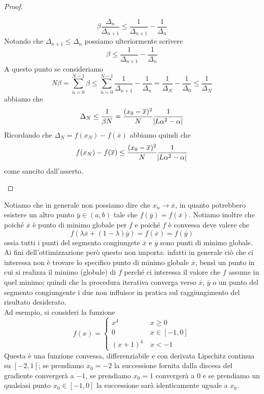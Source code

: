 \begin{proof}
\begin{enumerate}[(i)]
        \[
        \beta\frac{\Delta_n}{\Delta_{n+1}}\le \frac{1}{\Delta_{n+1}}-\frac{1}{\Delta_n}
        \]
        Notando che $\Delta_{n+1}\le \Delta_n$ possiamo ulteriormente scrivere
        \[
        \beta\le \frac{1}{\Delta_{n+1}}-\frac{1}{\Delta_n}
        \]
        A questo punto se consideriamo
        \[
        N\beta = \sum_{n=0}^{N-1} \beta \le \sum_{n=0}^{N-1}\frac{1}{\Delta_{n+1}}-\frac{1}{\Delta_n} = \frac{1}{\Delta_N}-\frac{1}{\Delta_0} \le \frac{1}{\Delta_N}
        \]
        abbiamo che
        \[
        \Delta_N \le \frac{1}{\beta N} = \frac{(x_0-\overline{x})^2}{N}\frac{1}{\abs{L\alpha^2-\alpha}}
        \]
        Ricordando che $\Delta_N = f(x_N)-f(\overline{x})$ abbiamo quindi che
        \[
        f(x_N)-f(\overline{x})\le \frac{(x_0-\overline{x})^2}{N}\frac{1}{\abs{L\alpha^2-\alpha}}
        \]
        come sancito dall'asserto.
        \end{enumerate}
    \end{proof}
    \begin{remark}
            Notiamo che in generale non possiamo dire che $x_n\to\overline{x}$, in quanto potrebbero esistere un altro punto $\overline{y}\in(a,b)$ tale che $f(\overline{y})=f(\overline{x})$. Notiamo inoltre che poiché $\overline{x}$ è punto di minimo globale per $f$ e poiché $f$ è convessa deve valere che
            \[
            f(\lambda \overline{x} +(1-\lambda)\overline{y})=f(\overline{x})=f(\overline{y})
            \]
            ossia tutti i punti del segmento congiungete $\overline{x}$ e $\overline{y}$ sono punti di minimo globale. Ai fini dell'ottimizzazione però questo non importa: infatti in generale ciò che ci interessa non è trovare lo specifico punto di minimo globale $\overline{x}$, bensì un punto in cui si realizza il minimo (globale) di $f$ perché ci interessa il valore che $f$ assume in quel minimo; quindi che la procedura iterativa converga verso $\overline{x}$, $\overline{y}$ o un punto del segmento congiungente i due non influisce in pratica sul raggiungimento del risultato desiderato. \\
            Ad esempio, si consideri la funzione
            \[
            f(x) = \begin{cases}
                x^4\, & x\ge 0\\
                0\, & x\in[-1,0]\\
                (x+1)^4\, & x<-1
            \end{cases}
            \]
            Questa è una funzione convessa, differenziabile e con derivata Lipschitz continua su $[-2,1]$; se prendiamo $x_0=-2$ la successione fornita dalla discesa del gradiente convergerà a $-1$, se prendiamo $x_0=1$ convergerà a $0$ e se prendiamo un qualsiasi punto $x_0\in[-1,0]$ la successione sarà identicamente uguale a $x_0$.
        \end{remark}
\newpage